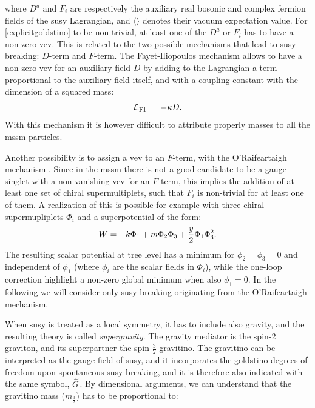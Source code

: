 \noindent where $D^a$ and $F_i$ are respectively the auxiliary real bosonic and complex fermion fields of the \gls{susy} Lagrangian, and $\langle \rangle $ denotes their vacuum expectation value. For \ref{explicitgoldstino} to be non-trivial, at least one of the $D^a$ or $F_i$ has to have a non-zero \gls{vev}. This is related to the two possible mechanisms that lead to \gls{susy} breaking: $D$-term and $F$-term. 
The Fayet-Iliopoulos mechanism \cite{Fayet:1974jb} allows to have a non-zero \gls{vev} for an auxiliary field $D$ by adding to the Lagrangian a term proportional to the auxiliary field itself, and with a coupling constant with the dimension of a squared mass:
\begin{equation}
\mathcal{L}_{\rm FI} \,=\, -\kappa D .
\end{equation}
With this mechanism it is however difficult to attribute properly masses to all the \gls{mssm} particles.

Another possibility is to assign a \gls{vev} to an $F$-term, with the O’Raifeartaigh mechanism \cite{ORaifeartaigh:1975nky}. Since in the \gls{mssm} there is not a good candidate to be a gauge singlet with a non-vanishing \gls{vev} for an $F$-term, this implies the addition of at least one set of chiral supermultiplets, such that $F_i$ is non-trivial for at least one of them. A realization of this is possible for example with three chiral supermupliplets $\Phi_i$ and a superpotential of the form:
\begin{equation}
W = -k \Phi_1 + m \Phi_2 \Phi_3 + {y\over 2} \Phi_1 \Phi_3^2 .
\label{oraif}
\end{equation}
The resulting scalar potential at tree level has a minimum for $\phi_2=\phi_3=0$ and independent of $\phi_1$ (where $\phi_i$ are the scalar fields in $\Phi_i$), while the one-loop correction highlight a non-zero global minimum when also $\phi_1=0$. In the following we will consider only \gls{susy} breaking originating from the O’Raifeartaigh mechanism.


When \gls{susy} is treated as a local symmetry, it has to include also gravity, and the resulting theory is called \textit{supergravity}. The gravity mediator is the spin-2 graviton, and its superpartner the spin-$\frac{3}{2}$ gravitino. The gravitino can be interpreted as the gauge field of \gls{susy}, and it incorporates the goldstino degrees of freedom upon spontaneous \gls{susy} breaking, and it is therefore also indicated with the same symbol, $\widetilde{G}$. By dimensional arguments, we can understand that the gravitino mass ($m_{\frac{3}{2}}$) has to be proportional to:

